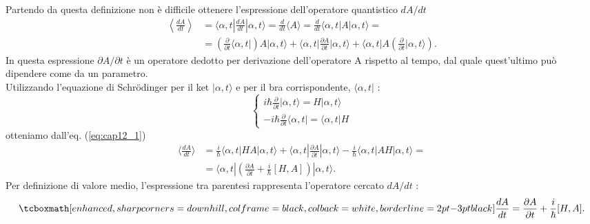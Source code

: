 \documentclass[a4paper,12pt,oneside]{book}
\begin{document}
Partendo da questa definizione non è difficile ottenere l'espressione dell'operatore quantistico $dA/dt$
	\begin{align}
	\label{eq:cap12_1}
	\left\langle \frac{dA}{dt} \right\rangle &= \langle \alpha,t| \frac{dA}{dt}| \alpha,t \rangle = \frac{d}{dt} \langle A \rangle = \frac{d}{dt} \langle \alpha ,t |A| \alpha ,t\rangle= \nonumber\\
	&=\left(\frac{\partial }{\partial{t}}\langle \alpha,t|\right) A|\alpha,t \rangle + \langle \alpha,t| \frac{\partial A}{\partial{t}}|\alpha,t \rangle + \langle\alpha,t|A \left(\frac{\partial }{\partial{t}}|\alpha,t\rangle\right).
	\end{align} 
In questa espressione ${\partial A}/{\partial{t}}$ è un operatore dedotto per derivazione dell'operatore A rispetto al tempo, dal quale quest'ultimo può dipendere come da un parametro.\\

Utilizzando l'equazione di Schr\"{o}dinger per il ket $|\alpha,t\rangle$ e per il bra corrispondente,   $\langle\alpha,t|$ :
	\begin{equation}
		\begin{cases}
		\displaystyle{i\hbar\frac{\partial }{\partial{t}}|\alpha,t\rangle= H|\alpha,t\rangle }\\[0.3cm]
	\displaystyle{-i\hbar\frac{\partial }{\partial{t}}\langle\alpha,t|= \langle\alpha,t|H } 
		\end{cases}
	\end{equation}
otteniamo dall'eq. (\ref{eq:cap12_1})
	\begin{align}
		\langle\frac{dA}{dt} \rangle &= \frac{i}{\hbar} \langle\alpha,t|HA|\alpha,t\rangle + \langle \alpha,t|\frac{\partial A}{\partial{t}}|\alpha,t \rangle -\frac{i}{\hbar} \langle \alpha,t|AH|\alpha,t\rangle=  \nonumber\\
		&= \langle \alpha,t| (\frac{\partial A}{\partial{t}} + \frac{i}{\hbar}[H,A] ) |\alpha,t\rangle .
	\end{align}
Per definizione di valore medio, l'espressione tra parentesi rappresenta l'operatore cercato $dA/dt$ :
	\begin{equation}
	\label{eq:cap12_2}
		\tcboxmath[enhanced, sharp corners=downhill, colframe=black, colback=white, borderline={2pt}{-3pt}{black}]{
			\frac{dA}{dt}= \frac{\partial A}{\partial{t}}+ \frac{i}{\hbar}[H,A].
			}
	\end{equation}\\
\end{document}
